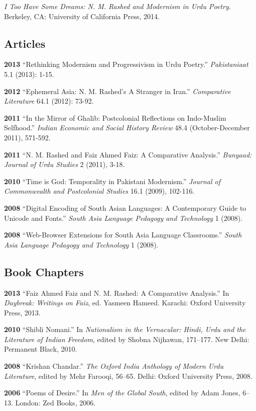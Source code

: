 \documentclass[letterpaper,12pt]{article}
\begin{document}
\emph{I Too Have Some Dreams: N. M. Rashed and Modernism in Urdu Poetry}.
Berkeley, CA: University of California Press, 2014.


\subsection{Articles%
  \label{articles}%
}

\textbf{2013}
“Rethinking Modernism and Progressivism in Urdu Poetry.”
\emph{Pakistaniaat} 5.1 (2013): 1-15.

\textbf{2012}
“Ephemeral Asia: N. M. Rashed’s A Stranger in Iran.”
\emph{Comparative Literature} 64.1 (2012): 73-92.

\textbf{2011}
“In the Mirror of Ghalib: Postcolonial Reflections on Indo-Muslim Selfhood.”
\emph{Indian Economic and Social History Review} 48.4 (October-December 2011), 571-592.

\textbf{2011}
“N. M. Rashed and Faiz Ahmed Faiz: A Comparative Analysis.”
\emph{Bunyaad: Journal of Urdu Studies}  2 (2011), 3-18.

\textbf{2010}
“Time is God: Temporality in Pakistani Modernism.”
\emph{Journal of Commonwealth and Postcolonial Studies} 16.1 (2009), 102-116.

\textbf{2008}
“Digital Encoding of South Asian Languages: A Contemporary Guide to Unicode and Fonts.”
\emph{South Asia Language Pedagogy and Technology} 1 (2008).

\textbf{2008}
“Web-Browser Extensions for South Asia Language Classrooms.”
\emph{South Asia Language Pedagogy and Technology} 1 (2008).


\subsection{Book Chapters%
  \label{book-chapters}%
}

\textbf{2013}
“Faiz Ahmed Faiz and N. M. Rashed: A Comparative Analysis.”
In \emph{Daybreak: Writings on Faiz},
ed. Yasmeen Hameed.
Karachi: Oxford University Press, 2013.

\textbf{2010}
“Shibli Nomani.”
In \emph{Nationalism in the Vernacular:
Hindi, Urdu and the Literature of Indian Freedom},
edited by Shobna Nijhawan,
171–177.
New Delhi: Permanent Black, 2010.

\textbf{2008} “Krishan Chandar.”
\emph{The Oxford India Anthology of Modern Urdu Literature},
edited by Mehr Farooqi, 56–65.
Delhi: Oxford University Press, 2008.

\textbf{2006}
“Poems of Desire.”
In \emph{Men of the Global South},
edited by Adam Jones,
6–13.
London: Zed Books, 2006.
\end{document}
